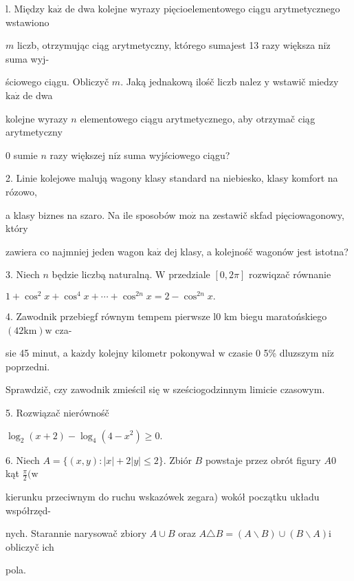 \documentclass[a4paper,12pt]{article}
\begin{document}
l. Między $\mathrm{k}\mathrm{a}\dot{\mathrm{z}}$ de dwa kolejne wyrazy pięcioelementowego ciągu arytmetycznego wstawiono

$m$ liczb, otrzymując ciąg arytmetyczny, którego sumajest 13 razy większa $\mathrm{n}\mathrm{i}\dot{\mathrm{z}}$ suma wyj-

ściowego ciągu. Obliczyč $m$. Jaką jednakową ilośč liczb nalez $\mathrm{y}$ wstawič miedzy $\mathrm{k}\mathrm{a}\dot{\mathrm{z}}$ de dwa

kolejne wyrazy $n$ elementowego ciągu arytmetycznego, aby otrzymač ciąg arytmetyczny

$0$ sumie $n$ razy większej $\mathrm{n}\mathrm{i}\dot{\mathrm{z}}$ suma wyjściowego ciągu?

2. Linie kolejowe malują wagony klasy standard na niebiesko, klasy komfort na rózowo,

a klasy biznes na szaro. Na ile sposobów $\mathrm{m}\mathrm{o}\dot{\mathrm{z}}$ na zestawič skfad pięciowagonowy, który

zawiera co najmniej jeden wagon $\mathrm{k}\mathrm{a}\dot{\mathrm{z}}$ dej klasy, a kolejnośč wagonów jest istotna?

3. Niech $n$ będzie liczbą naturalną. $\mathrm{W}$ przedziale $[0,2\pi]$ rozwiqzač równanie

$1+\cos^{2}x+\cos^{4}x+\cdots+\cos^{2n}x=2-\cos^{2n}x.$

4. Zawodnik przebiegf równym tempem pierwsze l0 km biegu maratońskiego $(42\mathrm{k}\mathrm{m})\mathrm{w}$ cza-

sie 45 minut, a $\mathrm{k}\mathrm{a}\dot{\mathrm{z}}\mathrm{d}\mathrm{y}$ kolejny kilometr pokonywał $\mathrm{w}$ czasie $0$ 5\% dluzszym $\mathrm{n}\mathrm{i}\dot{\mathrm{z}}$ poprzedni.

Sprawdzič, czy zawodnik zmieścil się $\mathrm{w}$ sześciogodzinnym limicie czasowym.

5. Rozwiązač nierównośč

$\log_{2}(x+2)-\log_{4}(4-x^{2})\geq 0.$

6. Niech $A=\{(x,y):|x|+2|y|\leq 2\}$. Zbiór $B$ powstaje przez obrót figury $A0$ kąt $\displaystyle \frac{\pi}{2} (\mathrm{w}$

kierunku przeciwnym do ruchu wskazówek zegara) wokół początku układu współrzęd-

nych. Starannie narysowač zbiory $A\cup B$ oraz $A\triangle B=(A\backslash B)\cup(B\backslash A)\mathrm{i}$ obliczyč ich

pola.
\end{document}

